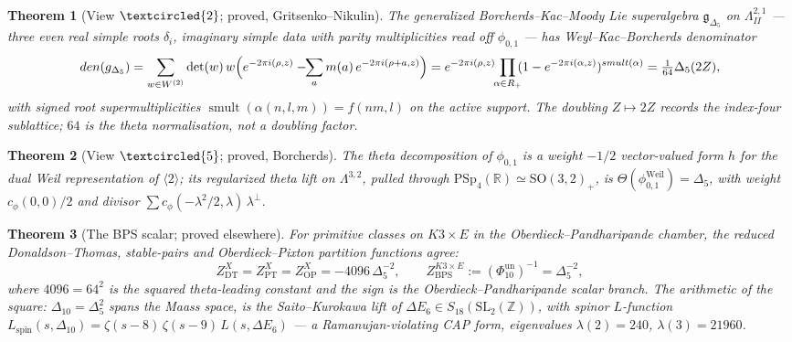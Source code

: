 \documentclass[11pt]{article}
\providecommand{\bR}{\mathbb{R}}
\providecommand{\bZ}{\mathbb{Z}}
\providecommand{\fg}{\mathfrak{g}}
\providecommand{\Dfive}{\Delta_5}
\providecommand{\Phiten}{\Phi_{10}}
\providecommand{\smult}{\operatorname{smult}}
\providecommand{\dend}{\operatorname{den}}
\providecommand{\SO}{\mathrm{SO}}
\newtheorem{theorem}{Theorem}[section]
\begin{document}
\begin{theorem}[View $\textcircled{2}$; proved, Gritsenko--Nikulin]
\label{thm:view2}
The generalized Borcherds--Kac--Moody Lie superalgebra
$\fg_{\Dfive}$ on $\Lambda^{2,1}_{II}$ --- three even real simple
roots $\delta_i$, imaginary simple data with parity multiplicities
read off $\phi_{0,1}$ --- has Weyl--Kac--Borcherds denominator
\[
\dend(\fg_{\Dfive})
=\sum_{w\in W^{(2)}}\det(w)\,
w\Bigl(e^{-2\pi i(\rho,z)}-\!\!\sum_{a}m(a)\,e^{-2\pi i(\rho+a,z)}\Bigr)
=e^{-2\pi i(\rho,z)}\!\!\prod_{\alpha\in\mathcal R_+}\!\!
(1-e^{-2\pi i(\alpha,z)})^{\smult(\alpha)}
=\tfrac1{64}\Dfive(2Z),
\]
with signed root supermultiplicities
$\smult(\alpha(n,l,m))=f(nm,l)$ on the active support. The doubling
$Z\mapsto2Z$ records the index-four sublattice; $64$ is the theta
normalisation, not a doubling factor.
\end{theorem}

\begin{theorem}[View $\textcircled{5}$; proved, Borcherds]
\label{thm:view5}
The theta decomposition of $\phi_{0,1}$ is a weight $-1/2$
vector-valued form $h$ for the dual Weil representation of
$\langle2\rangle$; its regularized theta lift on $\Lambda^{3,2}$,
pulled through $\mathrm{PSp}_4(\bR)\simeq\SO(3,2)_+$, is
$\Theta(\phi^{\mathrm{Weil}}_{0,1})=\Dfive$, with weight
$c_{\phi}(0,0)/2$ and divisor
$\sum c_\phi(-\lambda^2/2,\lambda)\,\lambda^\perp$.
\end{theorem}

\begin{theorem}[The BPS scalar; proved elsewhere]\label{thm:bps}
For primitive classes on $K3\times E$ in the
Oberdieck--Pandharipande chamber, the reduced Donaldson--Thomas,
stable-pairs and Oberdieck--Pixton partition functions agree:
\[
Z^X_{\mathrm{DT}}=Z^X_{\mathrm{PT}}=Z^X_{\mathrm{OP}}
=-4096\,\Dfive^{-2},
\qquad
Z^{K3\times E}_{\mathrm{BPS}}:=(\Phiten^{\mathrm{un}})^{-1}
=\Dfive^{-2},
\]
where $4096=64^2$ is the squared theta-leading constant and the sign
is the Oberdieck--Pandharipande scalar branch. The arithmetic of the
square: $\Delta_{10}=\Dfive^2$ spans the Maass space, is the
Saito--Kurokawa lift of $\Delta E_6\in S_{18}(\mathrm{SL}_2(\bZ))$,
with spinor $L$-function
$L_{\mathrm{spin}}(s,\Delta_{10})=\zeta(s-8)\,\zeta(s-9)\,
L(s,\Delta E_6)$ --- a Ramanujan-violating CAP form, eigenvalues
$\lambda(2)=240$, $\lambda(3)=21960$.
\end{theorem}
\end{document}
